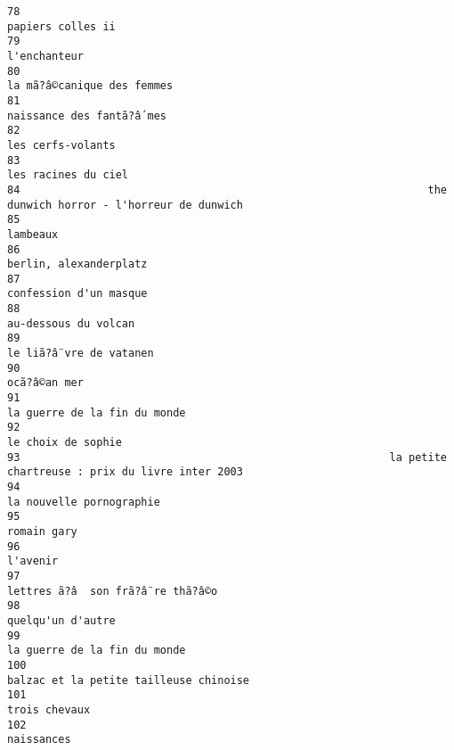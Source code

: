 \documentclass[
]{report}
\begin{document}
\begin{verbatim}
78                                                                                        papiers colles ii
79                                                                                             l'enchanteur
80                                                                               la mã?â©canique des femmes
81                                                                                naissance des fantã?â´mes
82                                                                                        les cerfs-volants
83                                                                                      les racines du ciel
84                                                                the dunwich horror - l'horreur de dunwich
85                                                                                                 lambeaux
86                                                                                   berlin, alexanderplatz
87                                                                                   confession d'un masque
88                                                                                     au-dessous du volcan
89                                                                                  le liã?â¨vre de vatanen
90                                                                                             ocã?â©an mer
91                                                                             la guerre de la fin du monde
92                                                                                       le choix de sophie
93                                                          la petite chartreuse : prix du livre inter 2003
94                                                                                 la nouvelle pornographie
95                                                                                              romain gary
96                                                                                                 l'avenir
97                                                                        lettres ã?â  son frã?â¨re thã?â©o
98                                                                                        quelqu'un d'autre
99                                                                             la guerre de la fin du monde
100                                                                  balzac et la petite tailleuse chinoise
101                                                                                           trois chevaux
102                                                                                              naissances

\end{verbatim}
\end{document}
